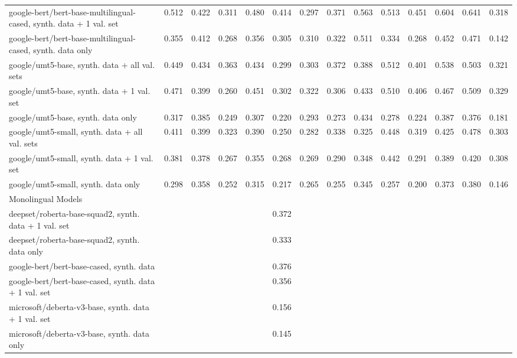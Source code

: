 \documentclass[11pt]{article}
\begin{document}
\begin{landscape}
\begin{table}[h]
{\begin{tabular}{lccccccccccccc}
    google-bert/bert-base-multilingual-cased, synth. data + 1 val. set & 0.512 & 0.422 & 0.311 & 0.480 & 0.414 & 0.297 & 0.371 & 0.563 & 0.513 & 0.451 & 0.604 & 0.641 & 0.318 \\
    google-bert/bert-base-multilingual-cased, synth. data only & 0.355 & 0.412 & 0.268 & 0.356 & 0.305 & 0.310 & 0.322 & 0.511 & 0.334 & 0.268 & 0.452 & 0.471 & 0.142 \\
    \hline
    google/umt5-base, synth. data + all val. sets & 0.449 & 0.434 & 0.363 & 0.434 & 0.299 & 0.303 & 0.372 & 0.388 & 0.512 & 0.401 & 0.538 & 0.503 & 0.321 \\
    google/umt5-base, synth. data + 1 val. set & 0.471 & 0.399 & 0.260 & 0.451 & 0.302 & 0.322 & 0.306 & 0.433 & 0.510 & 0.406 & 0.467 & 0.509 & 0.329 \\
    google/umt5-base, synth. data only & 0.317 & 0.385 & 0.249 & 0.307 & 0.220 & 0.293 & 0.273 & 0.434 & 0.278 & 0.224 & 0.387 & 0.376 & 0.181 \\
    \hline
    google/umt5-small, synth. data + all val. sets & 0.411 & 0.399 & 0.323 & 0.390 & 0.250 & 0.282 & 0.338 & 0.325 & 0.448 & 0.319 & 0.425 & 0.478 & 0.303 \\
    google/umt5-small, synth. data + 1 val. set & 0.381 & 0.378 & 0.267 & 0.355 & 0.268 & 0.269 & 0.290 & 0.348 & 0.442 & 0.291 & 0.389 & 0.420 & 0.308 \\
    google/umt5-small, synth. data only & 0.298 & 0.358 & 0.252 & 0.315 & 0.217 & 0.265 & 0.255 & 0.345 & 0.257 & 0.200 & 0.373 & 0.380 & 0.146 \\
    \midrule
    Monolingual Models \\
    \midrule
    deepset/roberta-base-squad2, synth. data + 1 val. set &   &   &   &   & 0.372 &   &   &   &   &   &   &   &   \\
    deepset/roberta-base-squad2, synth. data only &  &   &   &   & 0.333 &   &   &   &   &   &   &   &   \\
    \hline
    google-bert/bert-base-cased, synth. data &   &   &   &   & 0.376 &   &   &   &   &   &   &   &   \\
    google-bert/bert-base-cased, synth. data + 1 val. set &   &   &   &   & 0.356 &   &   &   &   &   &   &   &   \\
    \hline
    microsoft/deberta-v3-base, synth. data + 1 val. set &   &   &   &   & 0.156 &   &   &   &   &   &   &   &   \\
    microsoft/deberta-v3-base, synth. data only &   &   &   &   & 0.145 &   &   &   &   &   &   &   &   \\    
    \end{tabular}
}
\end{table}
\end{landscape}
    
\twocolumn
\end{document}
